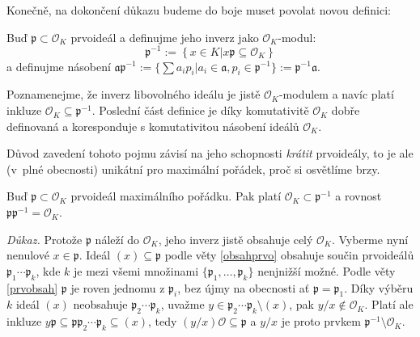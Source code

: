 \documentclass[12pt]{report}
\begin{document}
Konečně, na dokončení důkazu budeme do boje muset povolat novou definici:
\begin{definice}
Buď $\mathfrak{p} \subset \mathcal{O}_K$ prvoideál a definujme jeho inverz jako $\mathcal{O}_K$-modul:
\begin{equation*}
\mathfrak{p}^{-1} := \left\lbrace x \in K \left\vert \right. x \mathfrak{p} \subseteq \mathcal{O}_K \right\rbrace
\end{equation*}
a definujme násobení $\mathfrak{a} \mathfrak{p}^{-1} := \lbrace \sum a_i p_i \vert a_i \in \mathfrak{a}, p_i \in \mathfrak{p}^{-1} \rbrace := \mathfrak{p}^{-1} \mathfrak{a}$.
\end{definice}

Poznamenejme, že inverz libovolného ideálu je jistě $\mathcal{O}_K$-modulem a navíc platí inkluze $\mathcal{O}_K \subseteq \mathfrak{p}^{-1}$. Poslední část definice je díky komutativitě $\mathcal{O}_K$ dobře definovaná a koresponduje s komutativitou násobení ideálů $\mathcal{O}_K$.

Důvod zavedení tohoto pojmu závisí na jeho schopnosti \textit{krátit} prvoideály, to je ale (v~plné obecnosti) unikátní pro maximální pořádek, proč si osvětlíme brzy.

\begin{veta}
Buď $\mathfrak{p} \subset \mathcal{O}_K$ prvoideál maximálního pořádku. Pak platí $\mathcal{O}_K \subset \mathfrak{p}^{-1}$ a rovnost $\mathfrak{p} \mathfrak{p}^{-1} = \mathcal{O}_K$.
\end{veta}
\noindent \textit{Důkaz.} Protože $\mathfrak{p}$ náleží do $\mathcal{O}_K$, jeho inverz jistě obsahuje celý $\mathcal{O}_K$. Vyberme nyní nenulové $x \in \mathfrak{p}$. Ideál $(x) \subseteq \mathfrak{p}$ podle věty \ref{obsahprvo} obsahuje součin prvoideálů $\mathfrak{p}_1 \cdots \mathfrak{p}_k$, kde $k$ je mezi všemi množinami $\lbrace \mathfrak{p}_1,\dots,\mathfrak{p}_k \rbrace$ nenjnižší možné. Podle věty \ref{prvobsah} $\mathfrak{p}$ je roven jednomu z $\mathfrak{p}_i$, bez újmy na obecnosti ať $\mathfrak{p} = \mathfrak{p}_1$. Díky výběru $k$ ideál $(x)$ neobsahuje $\mathfrak{p}_2 \cdots \mathfrak{p}_k$, uvažme $y \in \mathfrak{p}_2 \cdots \mathfrak{p}_k \setminus (x)$, pak $y/x \not\in \mathcal{O}_K$. Platí ale inkluze $y \mathfrak{p} \subseteq \mathfrak{p} \mathfrak{p}_2 \cdots \mathfrak{p}_k \subseteq (x)$, tedy $(y/x) \mathcal{O} \subseteq \mathfrak{p}$ a $y/x$ je proto prvkem $\mathfrak{p}^{-1} \setminus \mathcal{O}_K$.
\end{document}
